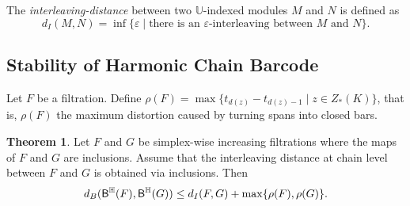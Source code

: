 \documentclass[10pt,a4paper]{amsart}
\newcommand {\mm}[1] {\ifmmode{#1}\else{\mbox{\(#1\)}}\fi}
\newcommand{\har}           {\mm{\mathbb{H}}}
\newcommand{\eps}        {\varepsilon}
\theoremstyle{definition}
\newcommand{\hbarc}{\mathsf{B}^\har}
\newtheorem{theorem}{Theorem}
\newtheorem{proposition}[theorem]{Proposition}
\theoremstyle{remark}
\begin{document}
The \emph{interleaving-distance} between two $\mathbb{U}$-indexed modules $M$ and $N$ is defined as $$ d_I(M,N) = \inf \{\eps\mid \text{there is an $\eps$-interleaving between $M$ and $N$} \}.$$





\subsection{Stability of Harmonic Chain Barcode}\label{subsec:stability}


Let $F$ be a filtration. Define $\rho(F) = \max \{ t_{d(z)} - t_{d(z)-1} \mid z\in Z_*(K)\}$, that is, $\rho(F)$ the maximum distortion caused by turning spans into closed bars.


\begin{theorem}

Let $F$ and $G$ be simplex-wise increasing filtrations where the maps of $F$ and $G$ are inclusions. Assume that the interleaving distance at chain level between $F$ and $G$ is obtained via inclusions. 
Then $$ d_B( {\hbarc(F)}, {\hbarc(G)} ) \leq d_{I}(F,G) +\max \{\rho(F), \rho(G) \}.$$
\end{theorem}
\end{document}
